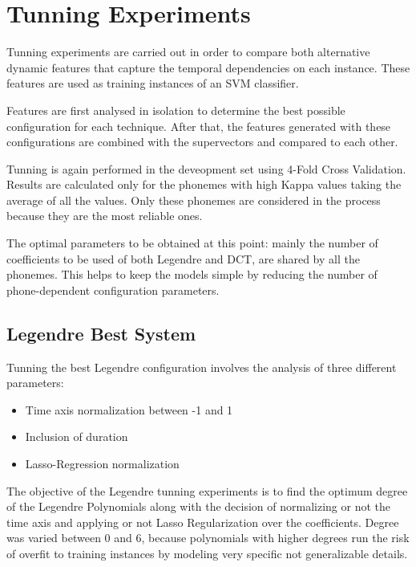 \section{Tunning Experiments}

Tunning experiments are carried out in order to compare both alternative
dynamic features that capture the temporal dependencies on each instance. These features are
used as training instances of an SVM classifier.

Features are first analysed in isolation to determine the best possible configuration for
each technique. After that, the features generated with these configurations are combined with
the supervectors and compared to each other.

Tunning is again performed in the deveopment set using 4-Fold Cross Validation. Results are
calculated only for the phonemes with high Kappa values taking the average of all the values.
Only these phonemes are considered in the process because they are the most reliable ones.

The optimal parameters to be obtained at this point: mainly the number of coefficients to
be used of both Legendre and DCT, are shared by all the phonemes. This helps to keep
the models simple by reducing the number of phone-dependent configuration parameters.

\subsection{Legendre Best System}

Tunning the best Legendre configuration involves the analysis of three different parameters:

\begin{itemize}
	\item Time axis normalization between -1 and 1
	\item Inclusion of duration
	\item Lasso-Regression normalization
\end{itemize}

The objective of the Legendre tunning experiments is to find the optimum degree of the Legendre
Polynomials along with the decision of normalizing or not the time axis and applying or not
Lasso Regularization over the coefficients. Degree was varied between 0 and 6,
because polynomials with
higher degrees run the risk of overfit to training instances by modeling very specific not
generalizable details.


